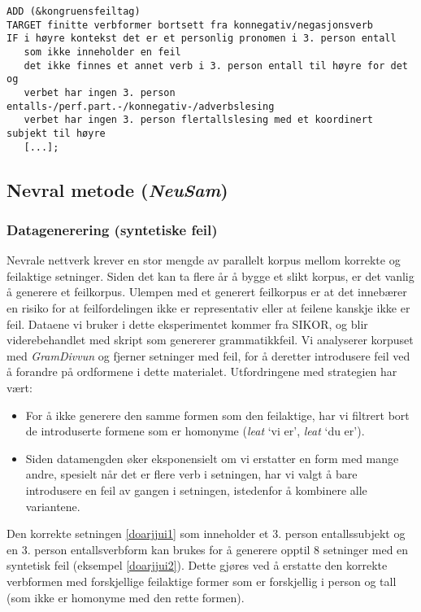 \documentclass{flammie}
\begin{document}
\begin{Verbatim}[frame=single,framerule=0.2mm,framesep=3mm,fontsize=\footnotesize,baselinestretch=1]
ADD (&kongruensfeiltag)
TARGET finitte verbformer bortsett fra konnegativ/negasjonsverb
IF i høyre kontekst det er et personlig pronomen i 3. person entall
   som ikke inneholder en feil
   det ikke finnes et annet verb i 3. person entall til høyre for det og
   verbet har ingen 3. person entalls-/perf.part.-/konnegativ-/adverbslesing
   verbet har ingen 3. person flertallslesing med et koordinert subjekt til høyre
   [...];
\end{Verbatim}


\subsection{Nevral metode (\textit{NeuSam})}


\subsubsection{Datagenerering (syntetiske feil)} \label{sec:datagenerering}

Nevrale nettverk krever en stor mengde av parallelt korpus mellom korrekte og
feilaktige setninger.  Siden det kan ta flere år å bygge et slikt korpus, er det
vanlig å generere et feilkorpus. Ulempen med et generert feilkorpus er at det
innebærer en risiko for at feilfordelingen ikke er representativ eller at
feilene kanskje ikke er feil.  Dataene vi bruker i dette eksperimentet kommer
fra SIKOR, og blir viderebehandlet med skript som genererer grammatikkfeil.  Vi
analyserer korpuset med \textit{GramDivvun} og fjerner setninger med feil, for å
deretter introdusere feil ved å forandre på ordformene i dette materialet.
Utfordringene med strategien har vært:

\begin{itemize}
  \item For å ikke generere den samme formen som den feilaktige, har vi filtrert bort de introduserte formene som er homonyme (\textit{leat} `vi er', \textit{leat} `du er').
  \item Siden datamengden øker eksponensielt om vi erstatter en form med mange andre, spesielt når det er flere verb i setningen, har vi valgt å bare introdusere en feil av gangen i setningen, istedenfor å kombinere alle variantene.
\end{itemize}

Den korrekte setningen \ref{doarjjui1} som inneholder et 3. person
entallssubjekt og en 3. person entallsverbform kan brukes for å generere opptil
8 setninger med en syntetisk feil (eksempel \ref{doarjjui2}). Dette gjøres ved å
erstatte den korrekte verbformen med forskjellige feilaktige former som er
forskjellig i person og tall (som ikke er homonyme med den rette formen).
\end{document}
